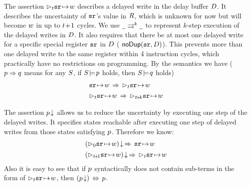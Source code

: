 

The assertion $\rhd_{t}{\texttt{sr}} \!\mapsto\! {w}$ describes a delayed
write in the delay buffer $D$. It describes the
uncertainty of $\texttt{sr}$'s value in $R$, which is unknown
for now but will become $w$ in up to $t\!+\!1$ cycles.
We use ${\underline{\ \,}}\rightrightarrows^{k}{\underline{\ \,}}$
to represent $k$-step execution of the delayed writes in $D$.
It also requires that there be
at most one delayed write for a specific special register $\texttt{sr}$
in $D$ (\ie{} $\textsf{noDup}({\texttt{sr}}, {D})$).
This prevents more than one delayed write to
the same register within 4 instruction cycles, which practically
have no restrictions on programming.
By the semantics we have
($p\Rightarrow q$ means for any $S$, if 
${S}\!\models\!{p}$ holds, then ${S}\!\models\!{q}$ holds)
$$
\begin{array}{l}
	\regst{\sr}{\word} \,\Rightarrow\, \dlyregst{\tick}{\sr}{\word}
	\\ \\[-8pt]
	\dlyregst{\tick}{\sr}{\word} \,\Rightarrow\,
	\dlyregst{\tick\!+\!k}{\sr}{\word}
\end{array}
$$

The assertion ${p}\!\downarrow$ allows us to reduce the uncertainty
by executing one step of the delayed writes.
It specifies states reachable after executing
one step of delayed writes from those states satisfying $p$.
Therefore we know:
$$
\begin{array}{l}
	\nxtAst{(\dlyregst{0}{\sr}{\word})} \,\Rightarrow\,
	\regst{\sr}{\word} 
	\\ \\[-8pt]
	\nxtAst{(\dlyregst{\tick\!+\!1}{\sr}{\word})} \,\Rightarrow\,
	\dlyregst{\tick}{\sr}{\word}
\end{array}
$$
Also it is easy to see that if $p$ syntactically
does not contain sub-terms in the form of $\rhd_{t}{\texttt{sr}} \!\mapsto\! {w}$,
then $({p}\!\downarrow) \,\Leftrightarrow \,p$.

